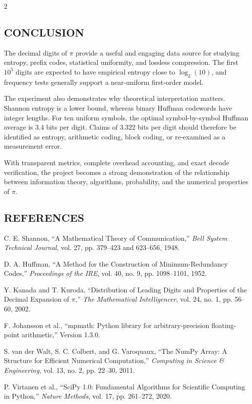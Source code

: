 \begin{multicols}{2}
  \subsection*{\centering\uppercase{Conclusion}}
  The decimal digits of $\pi$ provide a useful and engaging data source for studying entropy, prefix codes, statistical uniformity, and lossless compression. The first $10^5$ digits are expected to have empirical entropy close to $\log_2(10)$, and frequency tests generally support a near-uniform first-order model.

  \noindent
  The experiment also demonstrates why theoretical interpretation matters. Shannon entropy is a lower bound, whereas binary Huffman codewords have integer lengths. For ten uniform symbols, the optimal symbol-by-symbol Huffman average is $3.4$ bits per digit. Claims of $3.322$ bits per digit should therefore be identified as entropy, arithmetic coding, block coding, or re-examined as a measurement error.

  \noindent
  With transparent metrics, complete overhead accounting, and exact decode verification, the project becomes a strong demonstration of the relationship between information theory, algorithms, probability, and the numerical properties of $\pi$.

  \subsection*{\centering\uppercase{References}}
  {\small
  \begin{justify}
    \begin{enumerate}[label={\relax[\arabic*]},leftmargin=*,labelsep=0.5em,itemsep=0.20em,parsep=0pt]
      \item C. E. Shannon, “A Mathematical Theory of Communication,” \textit{Bell System Technical Journal}, vol. 27, pp. 379--423 and 623--656, 1948.
      \item D. A. Huffman, “A Method for the Construction of Minimum-Redundancy Codes,” \textit{Proceedings of the IRE}, vol. 40, no. 9, pp. 1098--1101, 1952.
      \item Y. Kanada and T. Kuroda, “Distribution of Leading Digits and Properties of the Decimal Expansion of $\pi$,” \textit{The Mathematical Intelligencer}, vol. 24, no. 1, pp. 56--60, 2002.
      \item F. Johansson et al., “mpmath: Python library for arbitrary-precision floating-point arithmetic,” Version 1.3.0.
      \item S. van der Walt, S. C. Colbert, and G. Varoquaux, “The NumPy Array: A Structure for Efficient Numerical Computation,” \textit{Computing in Science \& Engineering}, vol. 13, no. 2, pp. 22--30, 2011.
      \item P. Virtanen et al., “SciPy 1.0: Fundamental Algorithms for Scientific Computing in Python,” \textit{Nature Methods}, vol. 17, pp. 261--272, 2020.
    \end{enumerate}
  \end{justify}}

\end{multicols}
\endgroup
